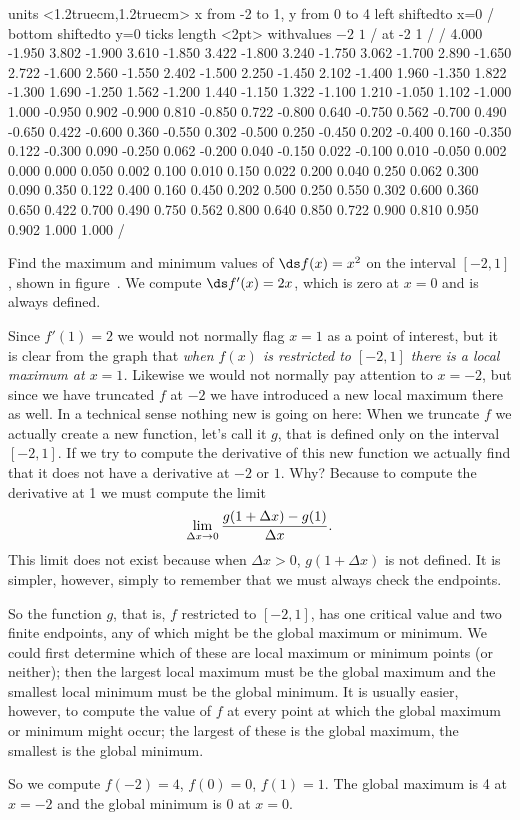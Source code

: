 \figure
\vbox{\beginpicture
\normalgraphs
\ninepoint
\setcoordinatesystem units <1.2truecm,1.2truecm>
\setplotarea x from -2 to 1, y from 0 to 4
\axis left shiftedto x=0 /
\axis bottom shiftedto y=0 ticks length <2pt> withvalues {$-2$} {$1$} / at -2 1 / /
\setquadratic
{} 4.000 -1.950 3.802 -1.900 3.610 -1.850 3.422 -1.800 3.240 
-1.750 3.062 -1.700 2.890 -1.650 2.722 -1.600 2.560 -1.550 2.402 
-1.500 2.250 -1.450 2.102 -1.400 1.960 -1.350 1.822 -1.300 1.690 
-1.250 1.562 -1.200 1.440 -1.150 1.322 -1.100 1.210 -1.050 1.102 
-1.000 1.000 -0.950 0.902 -0.900 0.810 -0.850 0.722 -0.800 0.640 
-0.750 0.562 -0.700 0.490 -0.650 0.422 -0.600 0.360 -0.550 0.302 
-0.500 0.250 -0.450 0.202 -0.400 0.160 -0.350 0.122 -0.300 0.090 
-0.250 0.062 -0.200 0.040 -0.150 0.022 -0.100 0.010 -0.050 0.002 
0.000 0.000 0.050 0.002 0.100 0.010 0.150 0.022 0.200 0.040 
0.250 0.062 0.300 0.090 0.350 0.122 0.400 0.160 0.450 0.202 
0.500 0.250 0.550 0.302 0.600 0.360 0.650 0.422 0.700 0.490 
0.750 0.562 0.800 0.640 0.850 0.722 0.900 0.810 0.950 0.902 
1.000 1.000 /
\endpicture}

\begin{example} Find the maximum and minimum values of $\ds f(x)=x^2$ on the
interval $[-2,1]$, shown in figure~.  We
compute $\ds f'(x)=2x$, which is zero at $x=0$ and is always
defined. 

Since $f'(1)=2$ we would not normally flag $x=1$ as a point
of interest, but it is clear from the graph that {\it when $f(x)$ is
restricted to $[-2,1]$ there is a local maximum at $x=1$.} Likewise we
would not normally pay attention to $x=-2$, but since we have
truncated $f$ at $-2$ we have introduced a new local maximum there as
well. In a technical sense nothing new is going on here: When we
truncate $f$ we actually create a new function, let's call it $g$,
that is defined only on the interval $[-2,1]$. If we try to compute
the derivative of this new function we actually find that it does not
have a derivative at $-2$ or $1$. Why? Because to compute the
derivative at 1 we must compute the limit
$$\lim_{\Delta x\to 0} {g(1+\Delta x)-g(1)\over \Delta x}.$$
This limit does not exist because when $\Delta x>0$, 
$g(1+\Delta x)$ is not defined. It is simpler, however, simply to
remember that we must always check the endpoints.

So the function $g$, that is, $f$ restricted to $[-2,1]$, has one
critical value and two finite endpoints, any of which might be the
global maximum or minimum. We could first determine which of these are
local maximum or minimum points (or neither); then the largest local
maximum must be the global maximum and the smallest local minimum must
be the global minimum. It is usually easier, however, to compute the
value of $f$ at every point at which the global maximum or minimum
might occur; the largest of these is the global maximum, the smallest
is the global minimum.

So we compute $f(-2)=4$, $f(0)=0$, $f(1)=1$. The global maximum is 4
at $x=-2$ and the global minimum is 0 at $x=0$.
\end{example}

